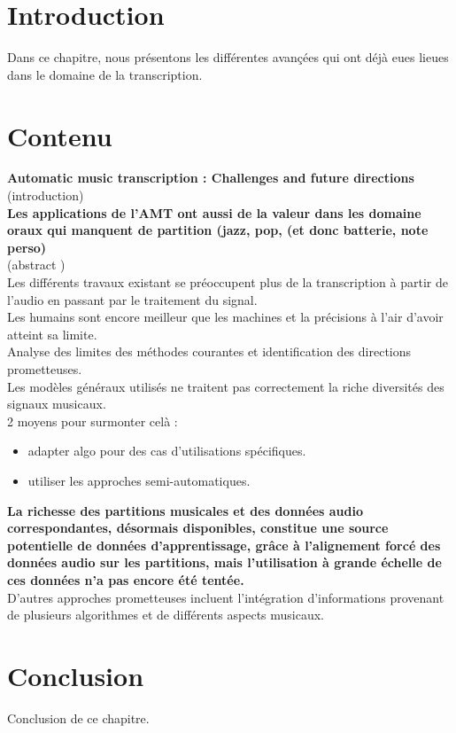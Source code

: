 \section{Introduction}

Dans ce chapitre, nous présentons les différentes avançées qui ont déjà eues lieues dans le domaine de la transcription.

\section{Contenu}
\textbf{Automatic music transcription : Challenges and future directions} \cite{article1}\\
(introduction\cite{article1})\\
\textbf{Les applications de l’AMT ont aussi de la valeur dans les domaine oraux qui manquent de partition (jazz, pop, (et donc batterie, note perso)}\\
(abstract \cite{article1})\\
Les différents travaux existant se préoccupent plus de la transcription à partir de l’audio en passant par le traitement du signal.\\
Les humains sont encore meilleur que les machines et la précisions à l’air d’avoir atteint sa limite.\\
Analyse des limites des méthodes courantes et identification des directions prometteuses.\\
Les modèles généraux utilisés ne traitent pas correctement la riche diversités des signaux musicaux.\\
2 moyens pour surmonter celà :
\begin{itemize}
	\item adapter algo pour des cas d’utilisations spécifiques.
	\item utiliser les approches semi-automatiques.
\end{itemize}
\textbf{La richesse des partitions musicales et des données audio correspondantes, désormais disponibles, constitue une source potentielle de données d'apprentissage, grâce à l'alignement forcé des données audio sur les partitions, mais l'utilisation à grande échelle de ces données n'a pas encore été tentée.}\\
D'autres approches prometteuses incluent l'intégration
d'informations provenant de plusieurs algorithmes et de différents aspects musicaux.
\section{Conclusion}
Conclusion de ce chapitre.